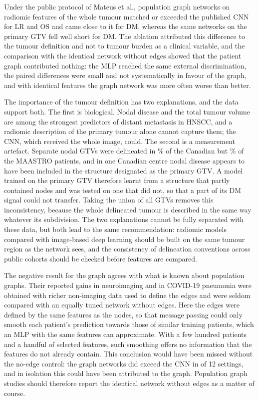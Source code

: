 \documentclass[11pt,a4paper]{article}
\begin{document}
Under the public protocol of Mateus et al., population graph networks on radiomic features of the whole tumour matched or exceeded the published CNN for LR and OS and came close to it for DM, whereas the same networks on the primary GTV fell well short for DM. The ablation attributed this difference to the tumour definition and not to tumour burden as a clinical variable, and the comparison with the identical network without edges showed that the patient graph contributed nothing: the MLP reached the same external discrimination, the paired differences were small and not systematically in favour of the graph, and with identical features the graph network was more often worse than better.

The importance of the tumour definition has two explanations, and the data support both. The first is biological. Nodal disease and the total tumour volume are among the strongest predictors of distant metastasis in HNSCC\cite{kjems2023volume,jensen2020nodalfdg}, and a radiomic description of the primary tumour alone cannot capture them; the CNN, which received the whole image, could. The second is a measurement artefact. Separate nodal GTVs were delineated in \nodalPctCan\% of the Canadian but \nodalPctMAA\% of the MAASTRO patients, and in one Canadian centre nodal disease appears to have been included in the structure designated as the primary GTV. A model trained on the primary GTV therefore learnt from a structure that partly contained nodes and was tested on one that did not, so that a part of its DM signal could not transfer. Taking the union of all GTVs removes this inconsistency, because the whole delineated tumour is described in the same way whatever its subdivision. The two explanations cannot be fully separated with these data, but both lead to the same recommendation: radiomic models compared with image-based deep learning should be built on the same tumour region as the network sees, and the consistency of delineation conventions across public cohorts should be checked before features are compared.

The negative result for the graph agrees with what is known about population graphs. Their reported gains in neuroimaging and in COVID-19 pneumonia were obtained with richer non-imaging data used to define the edges and were seldom compared with an equally tuned network without edges\cite{parisot2018population,keicher2023covid}. Here the edges were defined by the same features as the nodes, so that message passing could only smooth each patient's prediction towards those of similar training patients, which an MLP with the same features can approximate. With a few hundred patients and a handful of selected features, such smoothing offers no information that the features do not already contain. This conclusion would have been missed without the no-edge control: the graph networks did exceed the CNN in \winsGraph{} of 12 settings, and in isolation this could have been attributed to the graph. Population graph studies should therefore report the identical network without edges as a matter of course.
\end{document}
